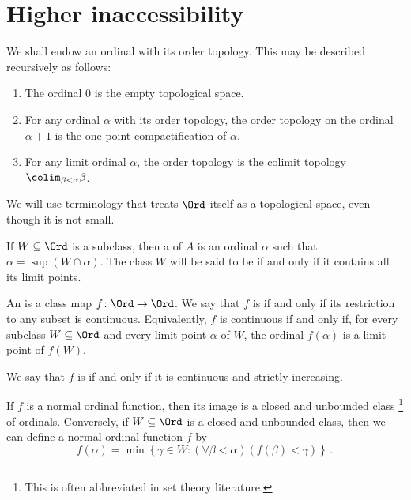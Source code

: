 
\section{Higher inaccessibility}%
\label{sec:higherinaccessibility}

\begin{nul}
	We shall endow an ordinal with its order topology.
	This may be described recursively as follows:
	\begin{enumerate}
		\item The ordinal $ 0 $ is the empty topological space.
		\item For any ordinal $ \alpha $ with its order topology,
			the order topology on the ordinal $ \alpha + 1 $
			is the one-point compactification of $ \alpha $.
		\item For any limit ordinal $ \alpha $,
			the order topology is the colimit topology
			$ \colim_{\beta < \alpha} \beta $.
	\end{enumerate}
\end{nul}

We will use terminology 
that treats $ \Ord $ itself as a topological space,
even though it is not small.

\begin{definition}
	If $ W \subseteq \Ord $ is a subclass,
	then a  of $ A $ is
	an ordinal $ \alpha $ such that $ \alpha = \sup (W \cap \alpha) $.
	The class $ W $ will be said to be  if and only if
	it contains all its limit points.

	An  is a class map $ f \colon \Ord \to \Ord $.
	We say that $ f $ is  if and only if
	its restriction to any subset is continuous.
	Equivalently, $ f $ is continuous if and only if,
	for every subclass $ W \subseteq \Ord $
	and every limit point $ \alpha $ of $ W $,
	the ordinal $ f(\alpha) $ is a limit point of $ f(W) $.

	We say that $ f $ is  if and only if
	it is continuous and strictly increasing.
\end{definition}

\begin{nul}
	If $ f $ is a normal ordinal function,
	then its image is a closed and unbounded class%
	\footnote{This is often abbreviated  in
	set theory literature.}
	of ordinals.
	Conversely, if $ W \subseteq \Ord $ is a closed and unbounded class,
	then we can define a normal ordinal function $ f $ by
	\[
		f(\alpha) =
		\min \left\{ \gamma \in W :
			(\forall \beta < \alpha)(f(\beta) < \gamma) \right\} \period
	\]
\end{nul}

